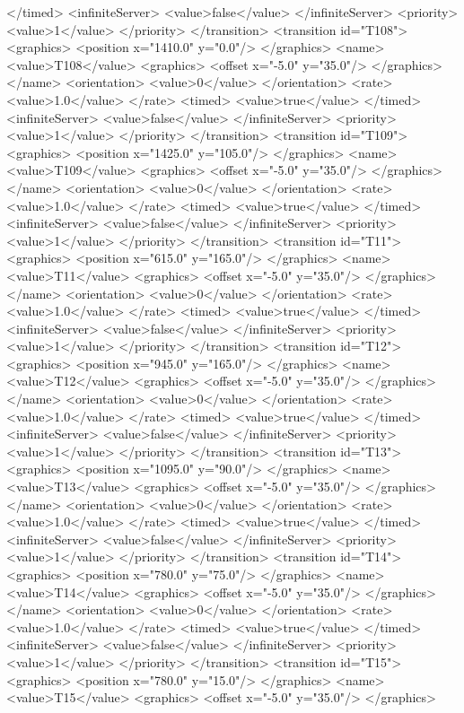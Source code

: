 </timed>
<infiniteServer>
<value>false</value>
</infiniteServer>
<priority>
<value>1</value>
</priority>
</transition>
<transition id="T108">
<graphics>
<position x="1410.0" y="0.0"/>
</graphics>
<name>
<value>T108</value>
<graphics>
<offset x="-5.0" y="35.0"/>
</graphics>
</name>
<orientation>
<value>0</value>
</orientation>
<rate>
<value>1.0</value>
</rate>
<timed>
<value>true</value>
</timed>
<infiniteServer>
<value>false</value>
</infiniteServer>
<priority>
<value>1</value>
</priority>
</transition>
<transition id="T109">
<graphics>
<position x="1425.0" y="105.0"/>
</graphics>
<name>
<value>T109</value>
<graphics>
<offset x="-5.0" y="35.0"/>
</graphics>
</name>
<orientation>
<value>0</value>
</orientation>
<rate>
<value>1.0</value>
</rate>
<timed>
<value>true</value>
</timed>
<infiniteServer>
<value>false</value>
</infiniteServer>
<priority>
<value>1</value>
</priority>
</transition>
<transition id="T11">
<graphics>
<position x="615.0" y="165.0"/>
</graphics>
<name>
<value>T11</value>
<graphics>
<offset x="-5.0" y="35.0"/>
</graphics>
</name>
<orientation>
<value>0</value>
</orientation>
<rate>
<value>1.0</value>
</rate>
<timed>
<value>true</value>
</timed>
<infiniteServer>
<value>false</value>
</infiniteServer>
<priority>
<value>1</value>
</priority>
</transition>
<transition id="T12">
<graphics>
<position x="945.0" y="165.0"/>
</graphics>
<name>
<value>T12</value>
<graphics>
<offset x="-5.0" y="35.0"/>
</graphics>
</name>
<orientation>
<value>0</value>
</orientation>
<rate>
<value>1.0</value>
</rate>
<timed>
<value>true</value>
</timed>
<infiniteServer>
<value>false</value>
</infiniteServer>
<priority>
<value>1</value>
</priority>
</transition>
<transition id="T13">
<graphics>
<position x="1095.0" y="90.0"/>
</graphics>
<name>
<value>T13</value>
<graphics>
<offset x="-5.0" y="35.0"/>
</graphics>
</name>
<orientation>
<value>0</value>
</orientation>
<rate>
<value>1.0</value>
</rate>
<timed>
<value>true</value>
</timed>
<infiniteServer>
<value>false</value>
</infiniteServer>
<priority>
<value>1</value>
</priority>
</transition>
<transition id="T14">
<graphics>
<position x="780.0" y="75.0"/>
</graphics>
<name>
<value>T14</value>
<graphics>
<offset x="-5.0" y="35.0"/>
</graphics>
</name>
<orientation>
<value>0</value>
</orientation>
<rate>
<value>1.0</value>
</rate>
<timed>
<value>true</value>
</timed>
<infiniteServer>
<value>false</value>
</infiniteServer>
<priority>
<value>1</value>
</priority>
</transition>
<transition id="T15">
<graphics>
<position x="780.0" y="15.0"/>
</graphics>
<name>
<value>T15</value>
<graphics>
<offset x="-5.0" y="35.0"/>
</graphics>
